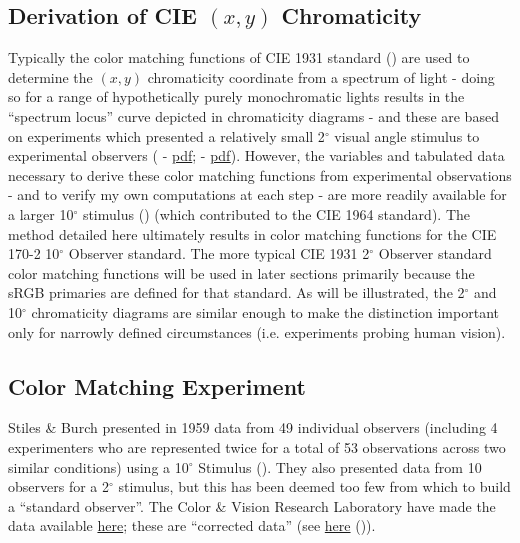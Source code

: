 \documentclass{article}
\begin{document}
\begin{multicols}{2}


\section{Derivation of CIE $(x,y)$ Chromaticity} \label{sec:derivation}


Typically the color matching functions of CIE 1931 standard (\cite{cie1932commission}) are used to determine the $(x,y)$ chromaticity coordinate from a spectrum of light - doing so for a range of hypothetically purely monochromatic lights results in the “spectrum locus” curve depicted in chromaticity diagrams - and these are based on experiments which presented a relatively small 2$^\circ$ visual angle stimulus to experimental observers (\cite{wright1929re} - \href{https://scholar.archive.org/work/heirr5iliras7mxawtf3uhmfr4/access/wayback/http://diyhpl.us/~bryan/papers2/paperbot/2555e9178fafa24612d7f4decae7b267.pdf}{pdf}; \cite{guild1931colorimetric} - \href{https://royalsocietypublishing.org/doi/pdf/10.1098/rsta.1932.0005}{pdf}).  However, the variables and tabulated data necessary to derive these color matching functions from experimental observations - and to verify my own computations at each step - are more readily available for a larger 10$^\circ$ stimulus (\cite{stiles1959npl}) (which contributed to the CIE 1964 standard).  The method detailed here ultimately results in color matching functions for the CIE 170-2 10$^\circ$ Observer standard.  The more typical CIE 1931 2$^\circ$ Observer standard color matching functions will be used in later sections primarily because the sRGB primaries are defined for that standard.  As will be illustrated, the 2$^\circ$ and 10$^\circ$ chromaticity diagrams are similar enough to make the distinction important only for narrowly defined circumstances (i.e. experiments probing human vision).

\subsection{Color Matching Experiment} %

Stiles \& Burch presented in 1959 data from 49 individual observers (including 4 experimenters who are represented twice for a total of 53 observations across two similar conditions) using a 10$^\circ$ Stimulus (\cite{stiles1959npl}).  They also presented data from 10 observers for a 2$^\circ$ stimulus, but this has been deemed too few from which to build a “standard observer”.  The Color \& Vision Research Laboratory have made the data available \href{http://www.cvrl.org/stilesburch10_ind.htm}{here}; these are “corrected data” (see \href{http://www.cvrl.org/database/text/sb_individual/sb10_individual.htm}{here} (\cite{stiles1958average})).


\end{multicols}
\end{document}
